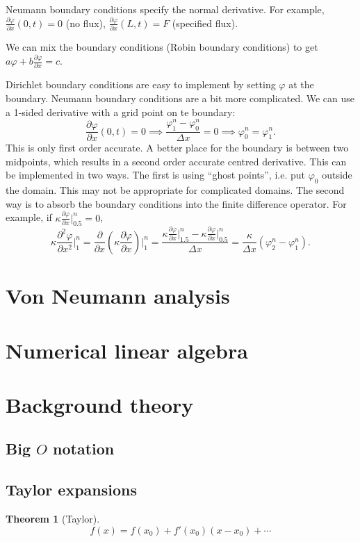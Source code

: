 \documentclass[11pt, a4paper]{article}
\renewcommand{\phi}{\varphi}
\theoremstyle{break}
\newtheorem{thm}{Theorem}[section]
\newcommand*{\Paren}[1]{\left(#1\right)}%
\newcommand{\dx}{\Delta x}
\newcommand{\der}[2]{\frac{\partial #1}{\partial #2}}
\newcommand{\pder}[3][2]{\frac{\partial^#1 #2}{\partial #3^#1}}
\newcommand{\eval}[1]{\big\rvert_{#1}}
\newcommand{\Eval}[1]{\bigg\rvert_{#1}}
\begin{document}
Neumann boundary conditions specify the normal derivative. For example, $\der\phi x(0,t)=0$ (no flux), $\der\phi x(L,t)=F$ (specified flux).

We can mix the boundary conditions (Robin boundary conditions) to get $a\phi+b\der\phi x=c$.

Dirichlet boundary conditions are easy to implement by setting $\phi$ at the boundary. Neumann boundary conditions are a bit more complicated. We can use a 1-sided derivative with a grid point on te boundary: \[\der\phi x(0,t)=0\implies \frac{\phi_1^n-\phi_0^n}{\dx}=0\implies \phi_0^n=\phi_1^n.\] This is only first order accurate. A better place for the boundary is between two midpoints, which results in a second order accurate centred derivative. This can be implemented in two ways. The first is using ``ghost points'', i.e. put $\phi_0$ outside the domain. This may not be appropriate for complicated domains. The second way is to absorb the boundary conditions into the finite difference operator. For example, if $\kappa \der\phi x\eval{0.5}^n=0$, \[\kappa \pder\phi x\Eval1^n=\der{}x\Paren{\kappa\der\phi x}\Eval 1^n=\frac{\kappa\der\phi x\eval{1.5}^n-\kappa \der\phi x\eval{0.5}^n}{\dx}=\frac{\kappa}{\dx}(\phi_2^n-\phi_1^n).\]


\section{Von Neumann analysis}


\section{Numerical linear algebra}\label{sec:numla}


\appendix
\section{Background theory}
\subsection{\texorpdfstring{Big $O$}{Big O} notation}\label{sec:bigO}
\subsection{Taylor expansions}\label{sec:taylor}
\begin{thm}[Taylor]\label{thm:taylor}
	\[f(x)=f(x_0)+f'(x_0)(x-x_0) + \cdots\]
\end{thm}

\nocite{*}



\label{lastpage}
\end{document}
